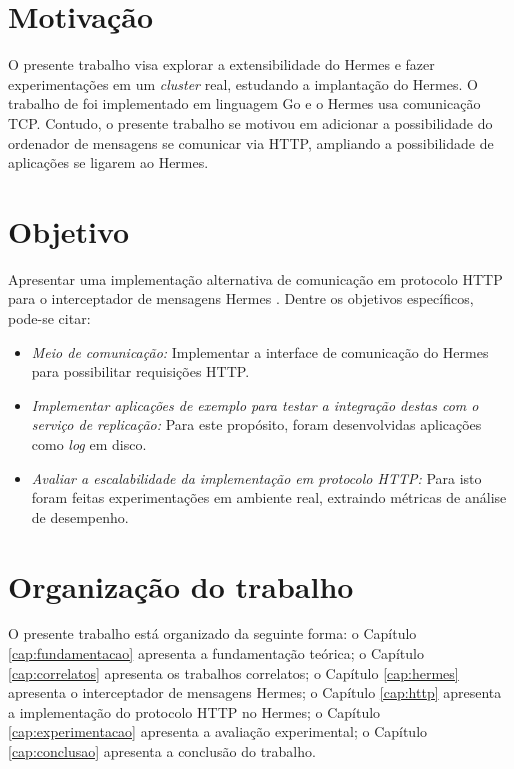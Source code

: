 \section{Motivação}

O presente trabalho visa explorar a extensibilidade do Hermes e fazer experimentações em um 
\textit{cluster} real, estudando a implantação do Hermes. O trabalho de 
\textcite{renan2021hermes} foi implementado em linguagem Go e o Hermes usa comunicação TCP. Contudo, o presente trabalho se motivou em adicionar a possibilidade do ordenador de mensagens se comunicar via HTTP, ampliando a possibilidade de aplicações se ligarem ao Hermes.

\section{Objetivo}

Apresentar uma implementação alternativa de comunicação em protocolo HTTP para o interceptador de mensagens Hermes \cite{renan2021hermes}.
Dentre os objetivos específicos, pode-se citar:

\begin{itemize}
\item \textit{Meio de comunicação:} Implementar a interface de comunicação do Hermes para possibilitar requisições HTTP.

\item \textit{Implementar aplicações de exemplo para testar a integração destas com o serviço de replicação:} Para este propósito, foram desenvolvidas aplicações como \textit{log} em disco.

\item \textit{Avaliar a escalabilidade da implementação em protocolo HTTP:}
Para isto foram feitas experimentações em ambiente real, extraindo métricas de análise de desempenho.
\end{itemize}

\section{Organização do trabalho}

O presente trabalho está organizado da seguinte forma: o Capítulo \ref{cap:fundamentacao} apresenta a fundamentação teórica; o Capítulo \ref{cap:correlatos} apresenta os trabalhos correlatos; o Capítulo \ref{cap:hermes} apresenta o interceptador de mensagens Hermes; o Capítulo \ref{cap:http} apresenta a implementação do protocolo HTTP no Hermes; o Capítulo \ref{cap:experimentacao} apresenta a avaliação experimental; o Capítulo \ref{cap:conclusao} apresenta a conclusão do trabalho.
